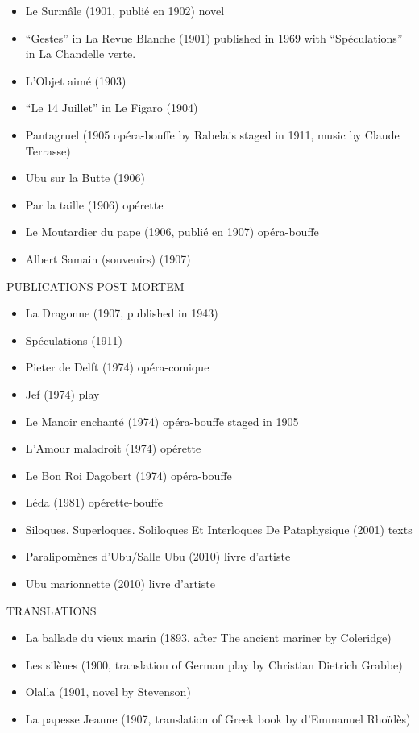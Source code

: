 \begin{itemize}
  \item Le Surmâle (1901, publié en 1902) novel
  \item ``Gestes'' in La Revue Blanche (1901) published in 1969 with ``Spéculations'' in  La Chandelle verte.
  \item L’Objet aimé (1903)
  \item ``Le 14 Juillet'' in Le Figaro (1904)
  \item Pantagruel (1905 opéra-bouffe by Rabelais staged in 1911, music by Claude Terrasse)
  \item Ubu sur la Butte (1906)
  \item Par la taille (1906) opérette
  \item Le Moutardier du pape (1906, publié en 1907) opéra-bouffe
  \item Albert Samain (souvenirs) (1907)
\end{itemize}


PUBLICATIONS POST-MORTEM
\begin{itemize}
  \item La Dragonne (1907, published in 1943)
  \item Spéculations (1911)
  \item Pieter de Delft (1974) opéra-comique
  \item Jef (1974) play
  \item Le Manoir enchanté (1974) opéra-bouffe staged in 1905
  \item L’Amour maladroit (1974) opérette
  \item Le Bon Roi Dagobert (1974) opéra-bouffe
  \item Léda (1981) opérette-bouffe
  \item Siloques. Superloques. Soliloques Et Interloques De Pataphysique (2001) texts
  \item Paralipomènes d'Ubu/Salle Ubu (2010) livre d'artiste
  \item Ubu marionnette (2010) livre d'artiste
\end{itemize}


TRANSLATIONS
\begin{itemize}
  \item La ballade du vieux marin (1893, after The ancient mariner by Coleridge)
  \item Les silènes (1900, translation of German play by Christian Dietrich Grabbe)
  \item Olalla (1901, novel by Stevenson)
  \item La papesse Jeanne (1907, translation of Greek book by d’Emmanuel Rhoïdès)
\end{itemize}


